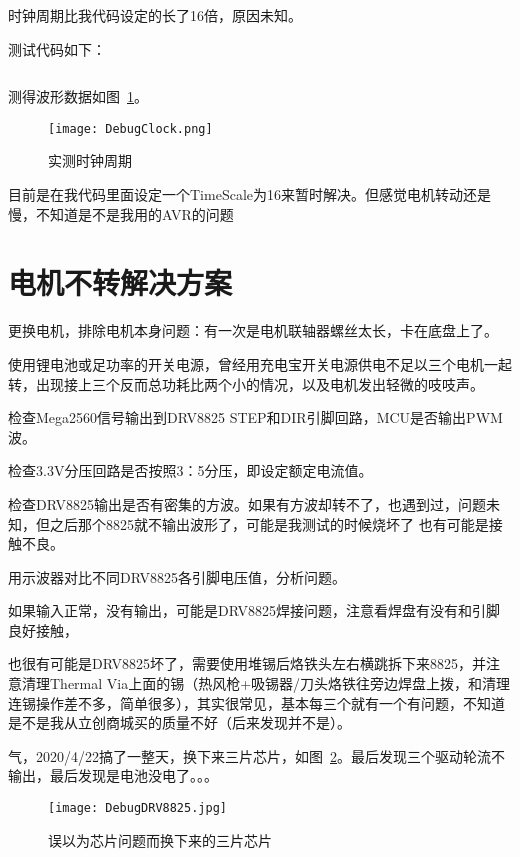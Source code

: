 时钟周期比我代码设定的长了16倍，原因未知。

测试代码如下：

\inputminted[mathescape, linenos, breaklines]{c}{Code/PWM-Test/PWM-Test.ino}

测得波形数据如图~\ref{fig:DebugClock}。

\begin{figure}[htbp]
    \centering
    \texttt{[image: DebugClock.png]}
    \caption{实测时钟周期}
    \label{fig:DebugClock}
\end{figure}

目前是在我代码里面设定一个TimeScale为16来暂时解决。但感觉电机转动还是慢，不知道是不是我用的AVR的问题

\section{电机不转解决方案}

更换电机，排除电机本身问题：有一次是电机联轴器螺丝太长，卡在底盘上了。

使用锂电池或足功率的开关电源，曾经用充电宝开关电源供电不足以三个电机一起转，出现接上三个反而总功耗比两个小的情况，以及电机发出轻微的吱吱声。

检查Mega2560信号输出到DRV8825 STEP和DIR引脚回路，MCU是否输出PWM波。

检查3.3V分压回路是否按照3：5分压，即设定额定电流值。

检查DRV8825输出是否有密集的方波。如果有方波却转不了，也遇到过，问题未知，但之后那个8825就不输出波形了，可能是我测试的时候烧坏了
也有可能是接触不良。

用示波器对比不同DRV8825各引脚电压值，分析问题。

如果输入正常，没有输出，可能是DRV8825焊接问题，注意看焊盘有没有和引脚良好接触，

也很有可能是DRV8825坏了，需要使用堆锡后烙铁头左右横跳拆下来8825，并注意清理Thermal Via上面的锡（热风枪+吸锡器/刀头烙铁往旁边焊盘上拨，和清理连锡操作差不多，简单很多），其实很常见，基本每三个就有一个有问题，不知道是不是我从立创商城买的质量不好（后来发现并不是）。

气，2020/4/22搞了一整天，换下来三片芯片，如图~\ref{fig:DebugDRV8825}。最后发现三个驱动轮流不输出，最后发现是电池没电了。。。

\begin{figure}[htbp]
    \centering
    \texttt{[image: DebugDRV8825.jpg]}
    \caption{误以为芯片问题而换下来的三片芯片}
    \label{fig:DebugDRV8825}
\end{figure}

